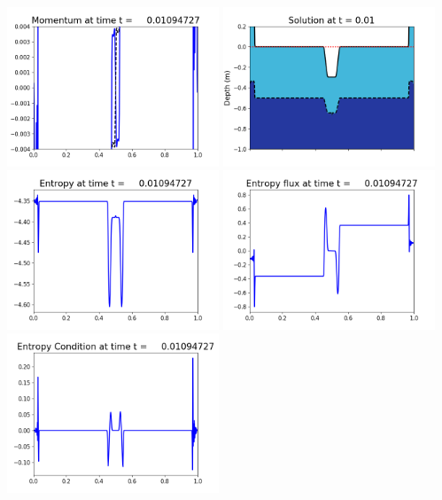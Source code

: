 \documentclass[11pt]{article}
\begin{document}
\vskip 10pt 
\includegraphics[width=0.475\textwidth]{frame0026fig1003.png}
\includegraphics[width=0.475\textwidth]{frame0026fig1006.png}
\vskip 10pt 
\includegraphics[width=0.475\textwidth]{frame0026fig1007.png}
\includegraphics[width=0.475\textwidth]{frame0026fig1008.png}
\vskip 10pt 
\includegraphics[width=0.475\textwidth]{frame0026fig1009.png}
\end{document}
